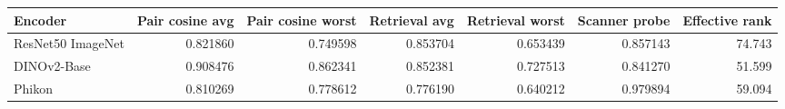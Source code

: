 \begin{tabular}{lrrrrrr}
\toprule
Encoder & Pair cosine avg & Pair cosine worst & Retrieval avg & Retrieval worst & Scanner probe & Effective rank \\
\midrule
ResNet50 ImageNet & 0.821860 & 0.749598 & 0.853704 & 0.653439 & 0.857143 & 74.743 \\
DINOv2-Base & 0.908476 & 0.862341 & 0.852381 & 0.727513 & 0.841270 & 51.599 \\
Phikon & 0.810269 & 0.778612 & 0.776190 & 0.640212 & 0.979894 & 59.094 \\
\bottomrule
\end{tabular}
